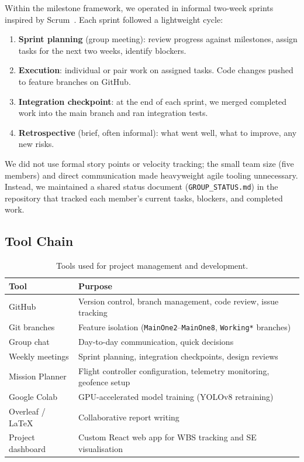 Within the milestone framework, we operated in informal two-week sprints inspired by Scrum~\cite{schwaber1997scrum}. Each sprint followed a lightweight cycle:

\begin{enumerate}
  \item \textbf{Sprint planning} (group meeting): review progress against milestones, assign tasks for the next two weeks, identify blockers.
  \item \textbf{Execution}: individual or pair work on assigned tasks. Code changes pushed to feature branches on GitHub.
  \item \textbf{Integration checkpoint}: at the end of each sprint, we merged completed work into the main branch and ran integration tests.
  \item \textbf{Retrospective} (brief, often informal): what went well, what to improve, any new risks.
\end{enumerate}

We did not use formal story points or velocity tracking; the small team size (five members) and direct communication made heavyweight agile tooling unnecessary. Instead, we maintained a shared status document (\texttt{GROUP\_STATUS.md}) in the repository that tracked each member's current tasks, blockers, and completed work.

\subsection{Tool Chain}

\begin{table}[htbp]
\centering
\compactTable
\caption{Tools used for project management and development.}
\label{tab:tools}
\begin{tabularx}{\linewidth}{l X}
\toprule
\textbf{Tool} & \textbf{Purpose} \\
\midrule
GitHub & Version control, branch management, code review, issue tracking \\
Git branches & Feature isolation (\texttt{MainOne2}--\texttt{MainOne8}, \texttt{Working*} branches) \\
Group chat & Day-to-day communication, quick decisions \\
Weekly meetings & Sprint planning, integration checkpoints, design reviews \\
Mission Planner & Flight controller configuration, telemetry monitoring, geofence setup \\
Google Colab & GPU-accelerated model training (YOLOv8 retraining) \\
Overleaf / \LaTeX & Collaborative report writing \\
Project dashboard & Custom React web app for WBS tracking and SE visualisation \\
\bottomrule
\end{tabularx}
\end{table}

